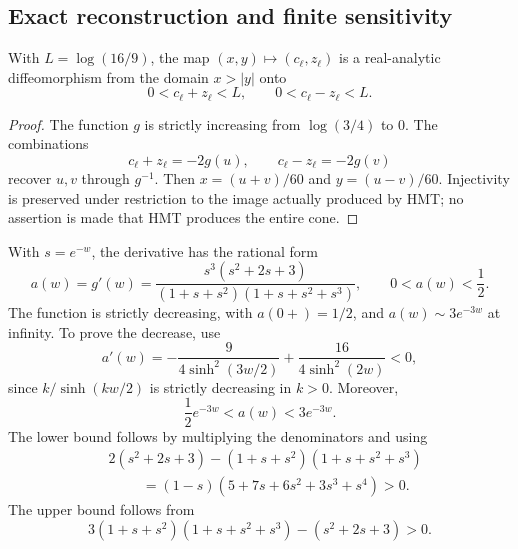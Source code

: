 \subsection{Exact reconstruction and finite sensitivity}
\label{md:comp:restitucion}

\begin{proposition}
\label{md:comp:prop-restitucion}
With \(L=\log(16/9)\), the map
\((x,y)\longmapsto(c_\ell,z_\ell)\) is a real-analytic diffeomorphism
from the domain \(x>|y|\) onto
\begin{equation}
 0<c_\ell+z_\ell<L,\qquad 0<c_\ell-z_\ell<L.
 \label{md:comp:imagen-logaritmica}
\end{equation}
\end{proposition}
\begin{proof}
The function \(g\) is strictly increasing from \(\log(3/4)\) to \(0\).
The combinations
\[
 c_\ell+z_\ell=-2g(u),\qquad c_\ell-z_\ell=-2g(v)
\]
recover \(u,v\) through \(g^{-1}\). Then
\(x=(u+v)/60\) and \(y=(u-v)/60\).
Injectivity is preserved under restriction to the image actually
produced by HMT; no assertion is made that HMT produces the entire cone.
\end{proof}

With \(s=e^{-w}\), the derivative has the rational form
\begin{equation}
 a(w)=g'(w)=
 \frac{s^3(s^2+2s+3)}{(1+s+s^2)(1+s+s^2+s^3)},
 \qquad 0<a(w)<\frac12.
 \label{md:comp:derivada-racional}
\end{equation}
The function is strictly decreasing, with \(a(0+)=1/2\), and
\(a(w)\sim3e^{-3w}\) at infinity. To prove the decrease, use
\begin{equation}
 a'(w)=-\frac{9}{4\sinh^2(3w/2)}
        +\frac{16}{4\sinh^2(2w)}<0,
 \label{md:comp:decrecimiento}
\end{equation}
since \(k/\sinh(kw/2)\) is strictly decreasing in \(k>0\).
Moreover,
\begin{equation}
 \frac12e^{-3w}<a(w)<3e^{-3w}.
 \label{md:comp:cotas-exponenciales}
\end{equation}
The lower bound follows by multiplying the denominators and using
\begin{equation}
 \begin{split}
 &2(s^2+2s+3)-(1+s+s^2)(1+s+s^2+s^3)\\
 &\hspace{1cm}=(1-s)(5+7s+6s^2+3s^3+s^4)>0.
 \end{split}
 \label{md:comp:polinomio-cota}
\end{equation}
The upper bound follows from
\[
 3(1+s+s^2)(1+s+s^2+s^3)-(s^2+2s+3)>0.
\]

